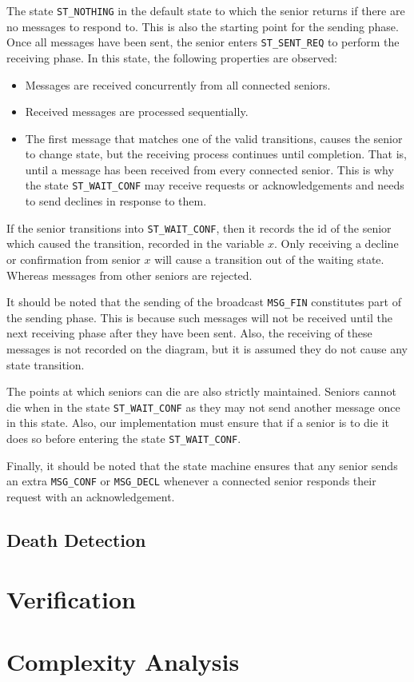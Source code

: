 \documentclass[12pt,a4paper]{scrartcl}
\begin{document}
The state \texttt{ST\_NOTHING} in the default state to which the senior returns if there are no messages to respond to.
This is also the starting point for the sending phase. Once all messages have been sent, the senior enters \texttt{ST\_SENT\_REQ} to perform the receiving phase.
In this state, the following properties are observed:
\begin{itemize}
    \item Messages are received concurrently from all connected seniors.
    \item Received messages are processed sequentially.
    \item The first message that matches one of the valid transitions, causes the senior to change state, but the receiving process continues until completion.
          That is, until a message has been received from every connected senior.
          This is why the state \texttt{ST\_WAIT\_CONF} may receive requests or acknowledgements and needs to send declines in response to them.
\end{itemize}

If the senior transitions into \texttt{ST\_WAIT\_CONF}, then it records the id of the senior which caused the transition, recorded in the variable $x$.
Only receiving a decline or confirmation from senior $x$ will cause a transition out of the waiting state.
Whereas messages from other seniors are rejected.

It should be noted that the sending of the broadcast \texttt{MSG\_FIN} constitutes part of the sending phase.
This is because such messages will not be received until the next receiving phase after they have been sent.
Also, the receiving of these messages is not recorded on the diagram, but it is assumed they do not cause any state transition.

The points at which seniors can die are also strictly maintained.
Seniors cannot die when in the state \texttt{ST\_WAIT\_CONF} as they may not send another message once in this state.
Also, our implementation must ensure that if a senior is to die it does so before entering the state \texttt{ST\_WAIT\_CONF}.

Finally, it should be noted that the state machine ensures that any senior sends an extra \texttt{MSG\_CONF} or \texttt{MSG\_DECL} whenever a connected senior responds their request with an acknowledgement.

\subsection{Death Detection}

\section{Verification}

\section{Complexity Analysis}
\end{document}
